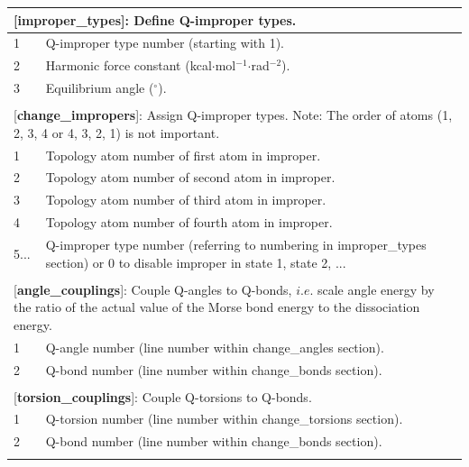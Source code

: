 \documentclass[a4paper,12pt]{article}
\begin{document}
\begin{longtable}{|p{53pt}|p{181pt}|p{160pt}|}
\multicolumn{3}{p{394pt}}{[\textbf{improper\_types}]: Define Q-improper types.}\\
\hline 1 & \multicolumn{2}{p{341pt}|}{Q-improper type number (starting with 1).}\\
\hline 2 & \multicolumn{2}{p{341pt}|}{Harmonic force constant (kcal$\cdot$mol$^{-1}$$\cdot$rad$^{-2}$).}\\
\hline 3 & \multicolumn{2}{p{341pt}|}{Equilibrium angle ($^{\circ}$).}\\
\hline
\multicolumn{3}{p{394pt}}{}\\

\multicolumn{3}{p{394pt}}{[\textbf{change\_impropers}]: Assign Q-improper types. Note: The order of atoms (1, 2, 3, 4 or 4, 3, 2, 1) is not important.}\\
\hline 1 & \multicolumn{2}{p{341pt}|}{Topology atom number of first atom in improper.}\\
\hline 2 & \multicolumn{2}{p{341pt}|}{Topology atom number of second atom in improper.}\\
\hline 3 & \multicolumn{2}{p{341pt}|}{Topology atom number of third atom in improper.}\\
\hline 4 & \multicolumn{2}{p{341pt}|}{Topology atom number of fourth atom in improper.}\\
\hline 5... & \multicolumn{2}{p{341pt}|}{Q-improper type number (referring to numbering in improper\_types section) or 0 to disable improper in state 1, state 2, ...}\\
\hline
\multicolumn{3}{p{394pt}}{}\\

\multicolumn{3}{p{394pt}}{[\textbf{angle\_couplings}]: Couple Q-angles to Q-bonds, $i.e.$ scale angle energy by the ratio of the actual value of the Morse bond energy to the dissociation energy.}\\
\hline 1 & \multicolumn{2}{p{341pt}|}{Q-angle number (line number within change\_angles section).}\\
\hline 2 & \multicolumn{2}{p{341pt}|}{Q-bond number (line number within change\_bonds section).}\\
\hline
\multicolumn{3}{p{394pt}}{}\\

\multicolumn{3}{p{394pt}}{[\textbf{torsion\_couplings}]: Couple Q-torsions to Q-bonds.}\\
\hline 1 & \multicolumn{2}{p{341pt}|}{Q-torsion number (line number within change\_torsions section).}\\
\hline 2 & \multicolumn{2}{p{341pt}|}{Q-bond number (line number within change\_bonds section).}\\
\hline
\multicolumn{3}{p{394pt}}{}\\


\end{longtable}
\end{document}
